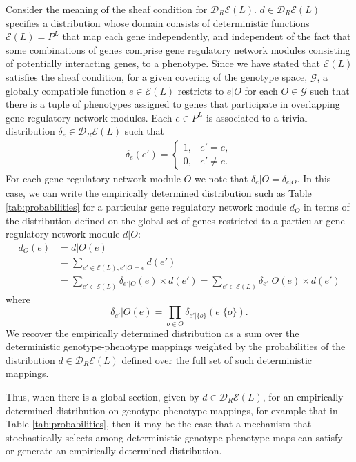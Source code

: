 \documentclass[10pt]{article}
\begin{document}
Consider the meaning of the sheaf condition for $\mathcal{D}_R\mathcal{E}(L)$. $d \in \mathcal{D}_R\mathcal{E}(L)$ specifies a distribution whose domain consists of deterministic functions $\mathcal{E}(L) = P^L$ that map each gene independently, and independent of the fact that some combinations of genes  comprise gene regulatory network modules consisting of potentially interacting genes, to a phenotype. Since we have stated that $\mathcal{E}(L)$ satisfies the sheaf condition, for a given covering of the genotype space, $\mathcal{G}$, a globally compatible function $e \in  \mathcal{E}(L)$ restricts to $e|O$ for each $O \in \mathcal{G}$ such that there is a tuple of phenotypes assigned to genes that participate in overlapping gene regulatory network modules. Each $e \in P^L$ is associated to a trivial distribution $\delta_e \in \mathcal{D}_R\mathcal{E}(L)$ such that
\begin{eqnarray}
\delta_e(e') =
\begin{cases}
1, & e' = e,\\
0, & e' \neq e.
\end{cases}
\end{eqnarray}
For each gene regulatory network module $O$ we note that $\delta_e|O = \delta_{e|O}$. In this case, we can write the empirically determined distribution such as Table \ref{tab:probabilities} for a particular gene regulatory network module $d_O$ in terms of the distribution defined on the global set of genes restricted to a particular gene regulatory network module $d|O$:
\begin{equation}\label{eq:factordist}
\begin{split}
d_O(e) &= d|O(e)\\
&= \sum_{e' \in \mathcal{E}(L),e'|O=e} d(e')\\
&= \sum_{e' \in \mathcal{E}(L)} \delta_{e'|O}(e) \times d(e') = \sum_{e' \in \mathcal{E}(L)} \delta_{e'}|O(e) \times d(e')
\end{split}
\end{equation}
where
\begin{equation*}
\delta_{e'}|O(e) = \prod_{o \in O} \delta_{e'|\{o\}}(e|\{o\}).
\end{equation*}
We recover the empirically determined distribution as a sum over the deterministic genotype-phenotype mappings weighted by the probabilities of the distribution $d \in \mathcal{D}_R\mathcal{E}(L)$ defined over the full set of such deterministic mappings.

Thus, when there is a global section, given by $d \in \mathcal{D}_R\mathcal{E}(L)$, for an empirically determined distribution on genotype-phenotype mappings, for example that in Table \ref{tab:probabilities}, then it may be the case that a mechanism that stochastically selects among deterministic genotype-phenotype maps can satisfy or generate an empirically determined distribution.
\end{document}
